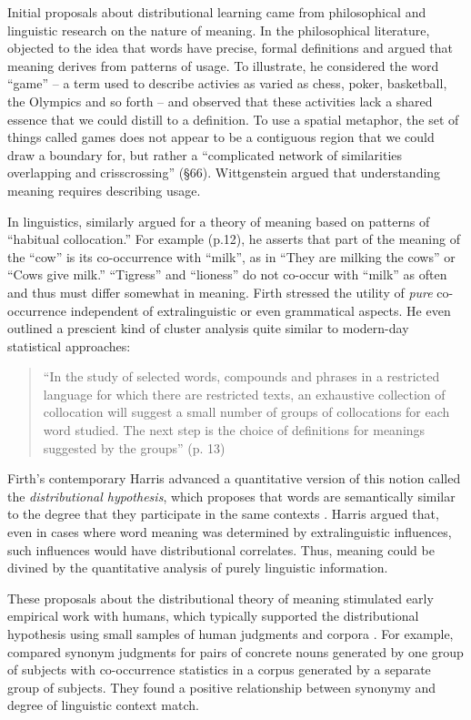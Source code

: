 \documentclass[man,floatsintext]{apa6}
\begin{document}
Initial proposals about distributional learning came from philosophical and linguistic research on the nature of meaning. In the philosophical literature, \citet{wittgenstein1953} objected to the idea that words have precise, formal definitions and argued that meaning derives from patterns of usage. To illustrate, he considered the word ``game'' -- a term used to describe activies as varied as chess, poker, basketball, the Olympics and so forth -- and observed that these activities lack a shared essence that we could distill to a definition. To use a spatial metaphor, the set of things called games does not appear to be a contiguous region that we could draw a boundary for, but rather a ``complicated network of similarities overlapping and crisscrossing'' (\S 66). Wittgenstein argued that understanding meaning requires describing usage.

In linguistics, \citet{firth1957} similarly argued for a theory of meaning based on patterns of ``habitual collocation.'' For example (p.12), he asserts that part of the meaning of the ``cow'' is its co-occurrence with  ``milk'', as in ``They are milking the cows'' or ``Cows give milk.'' ``Tigress'' and ``lioness'' do not co-occur with ``milk'' as often and thus must differ somewhat in meaning. Firth stressed the utility of \emph{pure} co-occurrence independent of extralinguistic or even grammatical aspects. He even outlined a prescient kind of cluster analysis quite similar to modern-day statistical approaches:

\begin{quote}
``In the study of selected words, compounds and phrases in a restricted language for which there are restricted texts, an exhaustive collection of collocation will suggest a small number of groups of collocations for each word studied. The next step is the choice of definitions for meanings suggested by the groups'' (p. 13)
\end{quote}
Firth's contemporary Harris advanced a quantitative version of this notion called the \emph{distributional hypothesis}, which proposes that words are semantically similar to the degree that they participate in the same contexts \citep{harris1951}. Harris argued that, even in cases where word meaning was determined by extralinguistic influences, such influences would have distributional correlates. Thus, meaning could be divined by the quantitative analysis of purely linguistic information.

These proposals about the distributional theory of meaning stimulated early empirical work with humans, which typically supported the distributional hypothesis using small samples of human judgments and corpora \citep{rubenstein1965, clark1968, stefflre1971, geffroy1973, berryrogghe1973, szalay1974}. For example, \citet{rubenstein1965} compared synonym judgments for pairs of concrete nouns generated by one group of subjects with co-occurrence statistics in a corpus generated by a separate group of subjects. They found a positive relationship between synonymy and degree of linguistic context match.
\end{document}
